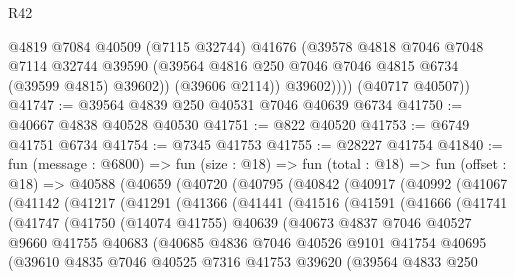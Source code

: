 \begin{lexlean}{R42}
\begin{coremodule}
{                @4819
                @7084
                @40509
                (@7115 @32744)
                @41676
                (@39578
                  @4818
                  @7046
                  @7048
                  @7114
                  @32744
                  @39590
                  (@39564 @4816 @250 @7046 @7046 @4815 @6734 (@39599 @4815) @39602))
                (@39606 @2114))
              @39602))))
      (@40717 @40507))
@41747 := @39564 @4839 @250 @40531 @7046 @40639 @6734
@41750 := @40667 @4838 @40528 @40530
@41751 := @822 @40520
@41753 := @6749 @41751 @6734
@41754 := @7345 @41753
@41755 := @28227 @41754
@41840 := fun (message : @6800) =>
  fun (size : @18) =>
  fun (total : @18) =>
  fun (offset : @18) =>
  @40588
    (@40659
      (@40720
        (@40795
          (@40842
            (@40917
              (@40992
                (@41067
                  (@41142
                    (@41217
                      (@41291
                        (@41366
                          (@41441
                            (@41516
                              (@41591
                                (@41666
                                  (@41741
                                    (@41747
                                      (@41750
                                        (@14074 @41755)
                                        @40639
                                        (@40673
                                          @4837
                                          @7046
                                          @40527
                                          @9660
                                          @41755
                                          @40683
                                          (@40685
                                            @4836
                                            @7046
                                            @40526
                                            @9101
                                            @41754
                                            @40695
                                            (@39610
                                              @4835
                                              @7046
                                              @40525
                                              @7316
                                              @41753
                                              @39620
                                              (@39564
                                                @4833
                                                @250
}
\end{coremodule}
\end{lexlean}
